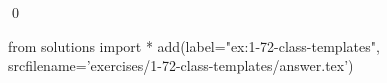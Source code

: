 
\begin{ex}
  \label{ex:1-72-class-templates}
  
  \qed
\end{ex}
\begin{python0}
from solutions import *
add(label="ex:1-72-class-templates",
    srcfilename='exercises/1-72-class-templates/answer.tex')
\end{python0}
